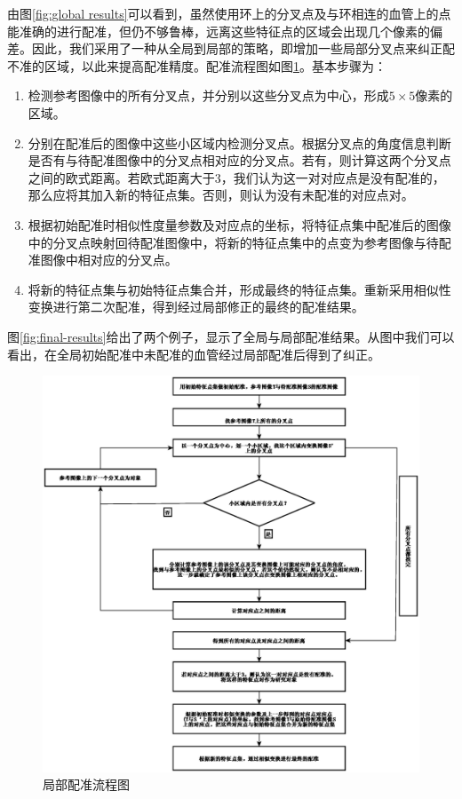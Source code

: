 由图\ref{fig:global results}可以看到，虽然使用环上的分叉点及与环相连的血管上的点能准确的进行配准，但仍不够鲁棒，远离这些特征点的区域会出现几个像素的偏差。因此，我们采用了一种从全局到局部的策略，即增加一些局部分叉点来纠正配不准的区域，以此来提高配准精度。配准流程图如图\ref{fig:local}。基本步骤为：
\begin{enumerate}
\item 检测参考图像中的所有分叉点，并分别以这些分叉点为中心，形成$5 \times 5$像素的区域。
\item 分别在配准后的图像中这些小区域内检测分叉点。根据分叉点的角度信息判断是否有与待配准图像中的分叉点相对应的分叉点。若有，则计算这两个分叉点之间的欧式距离。若欧式距离大于3，我们认为这一对对应点是没有配准的，那么应将其加入新的特征点集。否则，则认为没有未配准的对应点对。
\item 根据初始配准时相似性度量参数及对应点的坐标，将特征点集中配准后的图像中的分叉点映射回待配准图像中，将新的特征点集中的点变为参考图像与待配准图像中相对应的分叉点。
\item 将新的特征点集与初始特征点集合并，形成最终的特征点集。重新采用相似性变换进行第二次配准，得到经过局部修正的最终的配准结果。
\end{enumerate}
图\ref{fig:final-results}给出了两个例子，显示了全局与局部配准结果。从图中我们可以看出，在全局初始配准中未配准的血管经过局部配准后得到了纠正。
\begin{figure}[!ht]
  \centering
  \includegraphics[width=1\textwidth]{figures/local}
  \caption{局部配准流程图}
  \label{fig:local}
\end{figure}

